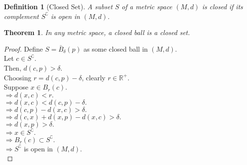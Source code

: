\documentclass{article}
\newtheorem{definition}{Definition}[section]
\newtheorem{theorem}{Theorem}[section]
\begin{document}
			\begin{definition}[Closed Set]
				\label{closed set}
				A subset $S$ of a metric space $(M, d)$ is closed if its complement $S^\complement$ is open in $(M, d)$.
			\end{definition}

			\begin{theorem}
				In any metric space, a closed ball is a closed set.
			\end{theorem}
			\begin{proof} 
				Define $S = \bar{B}_{\delta}(p)$ as some closed ball in $(M, d)$. \\
				Let $c \in S^\complement$. \\
				Then, $d(c, p) > \delta$. \\
				Choosing $r = d(c, p) - \delta$, clearly $r \in \mathbb{R}^+$. \\
				Suppose $x \in B_{r}(c)$. \\
				$\Rightarrow d(x, c) < r.$ \\
				$\Rightarrow d(x, c) < d(c, p) - \delta.$ \\
				$\Rightarrow d(c, p) - d(x, c) > \delta.$ \\
				$\Rightarrow d(c, x) + d(x, p) - d(x, c) > \delta.$ \\
				$\Rightarrow d(x, p) > \delta.$ \\
				$\Rightarrow x \in S^\complement.$ \\
				$\Rightarrow B_{r}(c) \subset S^\complement.$ \\
				$\Rightarrow S^\complement$ is open in $(M, d)$. \\
			\end{proof}
\end{document}
